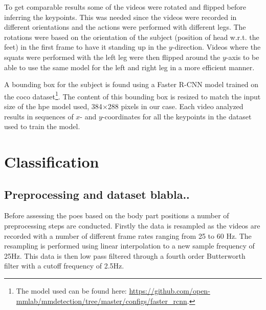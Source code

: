 To get comparable results some of the videos were rotated and flipped before inferring the keypoints. This was needed since the videos were recorded in different orientations and the actions were performed with different legs. The rotations were based on the orientation of the subject (position of head w.r.t. the feet) in the first frame to have it standing up in the $y$-direction. Videos where the squats were performed with the left leg were then flipped around the $y$-axis to be able to use the same model for the left and right leg in a more efficient manner.

A bounding box for the subject is found using a Faster R-CNN model trained on the \gls{coco} dataset\footnote{The model used can be found here: \url{https://github.com/open-mmlab/mmdetection/tree/master/configs/faster_rcnn}.}. The content of this bounding box is resized to match the input size of the \gls{hpe} model used, 384$\times$288 pixels in our case. Each video analyzed results in sequences of $x$- and $y$-coordinates for all the keypoints in the dataset used to train the model.

\section{Classification} \label{sec:met-class}

\subsection{Preprocessing and dataset blabla..} \label{sec:met-class-preproc}
Before assessing the \glspl{poe} based on the body part positions a number of preprocessing steps are conducted. Firstly the data is resampled as the videos are recorded with a number of different frame rates ranging from 25 to 60 Hz. The resampling is performed using linear interpolation to a new sample frequency of 25Hz. This data is then low pass filtered through a fourth order Butterworth filter with a cutoff frequency of 2.5Hz. %

